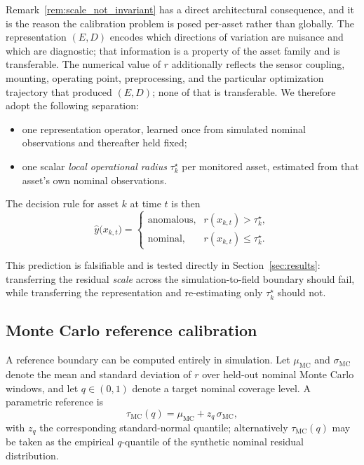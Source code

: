 \documentclass[a4paper]{cas-sc}
\newcommand{\residual}{\ensuremath{r}}
\newcommand{\taumc}{\ensuremath{\tau_{\mathrm{MC}}}}
\begin{document}
Remark~\ref{rem:scale_not_invariant} has a direct architectural
consequence, and it is the reason the calibration problem is posed
per-asset rather than globally. The representation \((E,D)\) encodes which
directions of variation are nuisance and which are diagnostic; that
information is a property of the asset family and is transferable. The
numerical value of \(\residual\) additionally reflects the sensor coupling,
mounting, operating point, preprocessing, and the particular optimization
trajectory that produced \((E,D)\); none of that is transferable. We
therefore adopt the following separation:

\begin{itemize}[leftmargin=1.5em]
\item one representation operator, learned once from simulated nominal
observations and thereafter held fixed;
\item one scalar \emph{local operational radius} \(\tau_k^\star\) per
monitored asset, estimated from that asset's own nominal observations.
\end{itemize}

The decision rule for asset \(k\) at time \(t\) is then
\begin{equation}
\hat y\bigl(x_{k,t}\bigr) =
\begin{cases}
\text{anomalous}, & \residual(x_{k,t}) > \tau_k^\star,\\[2pt]
\text{nominal},   & \residual(x_{k,t}) \le \tau_k^\star .
\end{cases}
\label{eq:decision_rule}
\end{equation}

This prediction is falsifiable and is tested directly in
Section~\ref{sec:results}: transferring the residual \emph{scale} across
the simulation-to-field boundary should fail, while transferring the
representation and re-estimating only \(\tau_k^\star\) should not.

\subsection{Monte Carlo reference calibration}
\label{subsec:mc_calibration}

A reference boundary can be computed entirely in simulation. Let
\(\mu_{\mathrm{MC}}\) and \(\sigma_{\mathrm{MC}}\) denote the mean and
standard deviation of \(\residual\) over held-out nominal Monte Carlo
windows, and let \(q\in(0,1)\) denote a target nominal coverage level. A
parametric reference is
\begin{equation}
\taumc(q) = \mu_{\mathrm{MC}} + z_q\,\sigma_{\mathrm{MC}},
\label{eq:tau_mc_quantile}
\end{equation}
with \(z_q\) the corresponding standard-normal quantile; alternatively
\(\taumc(q)\) may be taken as the empirical \(q\)-quantile of the synthetic
nominal residual distribution.
\end{document}
